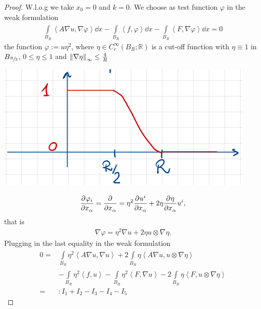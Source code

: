 \begin{proof}
	W.l.o.g we take \(x_{0}=0\) and \(k=0\). We choose as test function \(\varphi \) in the weak formulation
	\begin{gather}
		\int\limits_{B_{R}}^{} \left\langle  A \nabla u, \nabla \varphi \right\rangle \dd{x} - \int\limits_{B_{R}}^{} \left\langle  f,\varphi \right\rangle \dd{x} -\int\limits_{B_{R}}^{} \left\langle  F,\nabla\varphi \right\rangle \dd{x} =0
	\end{gather}
	the function \(\varphi:= u \eta^{2}\), where \(\eta \in C_{c}^{\infty}(B_{R}; \mathbb{R})\) is a cut-off function with \(\eta \equiv 1\) in \(B_{\sfrac{R}{2}}\), \(0 \leq \eta \leq 1\) and \(\norm{\nabla \eta}_{\infty} \leq \frac{4}{R}\)
	\begin{center}
		\includegraphics[scale=0.45]{pictures/picture01.png}
	\end{center}
	\begin{gather}
		\pdv[]{\varphi_{i}}{x_{\alpha}} = \pdv[]{}{x_{\alpha}} (\eta^{2}u^{2}) = \eta^{2}\pdv[]{u^{i}}{x_{\alpha}}+2 \eta \pdv[]{\eta}{x_{\alpha}} u^{i},
	\end{gather}
	that is
	\begin{gather}
		\nabla \varphi = \eta^{2} \nabla u + 2 \eta u \otimes \nabla \eta.
	\end{gather}
	Plugging in the last equality in the weak formulation
	\begin{align}
		0= & \int\limits_{B_{R}}^{} \eta^{2} \left\langle A \nabla u , \nabla u \right\rangle + 2 \int\limits_{B_{R}}^{} \eta \left\langle A \nabla u , u \otimes \nabla \eta \right\rangle  \\
		   & - \int\limits_{B_{R}}^{} \eta^{2} \left\langle f, u \right\rangle - \int\limits_{B_{R}}^{} \eta^{2} \left\langle F, \nabla u \right\rangle - 2 \int\limits_{B_{R}}^{} \eta \left\langle  F, u \otimes \nabla \eta \right\rangle  \\
		=  & : I_{1} + I_{2} -I_{3} - I_{4} - I_{5}

\end{align}
\end{proof}
